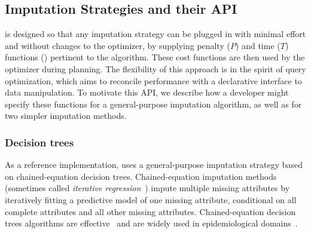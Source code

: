 {%

\subsection{Imputation Strategies and their API}
\label{sec:imputation}

\ProjectName{} is designed so that any imputation strategy can be plugged in with minimal effort and without changes to the optimizer, by supplying penalty ($P$) and time ($T$) functions () pertinent to the algorithm.
These cost functions are then used by the optimizer during planning.
The flexibility of this approach is in the spirit of query optimization, which aims to reconcile performance with a declarative interface to data manipulation.
To motivate this API, we describe how a developer might specify these functions for a general-purpose imputation algorithm, as well as for two simpler imputation methods.

\subsubsection{Decision trees}\label{subsubsec:decision-trees}

As a reference implementation,
\ProjectName{} uses a general-purpose imputation strategy based on
chained-equation decision trees.  Chained-equation imputation
methods~\cite{vanbuuren2011mice} (sometimes called \textit{iterative
regression}~\cite{gelman2006data}) impute multiple missing attributes by
iteratively fitting a predictive model of one missing attribute, conditional on
all complete attributes and all other missing attributes. Chained-equation
decision trees algorithms are effective~\cite{akande2015empirical}
and are widely used in epidemiological domains~\cite{burgette2010multiple}.

}
